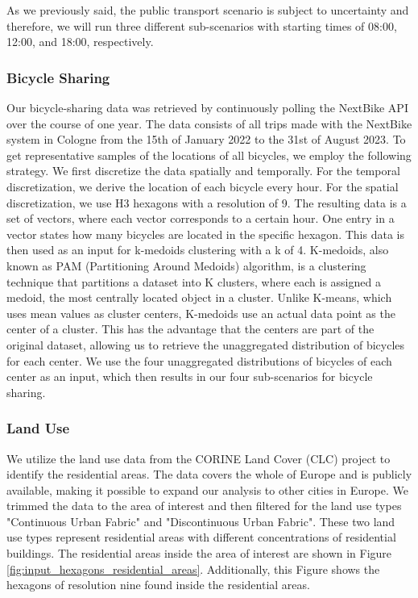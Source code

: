 As we previously said, the public transport scenario is subject to uncertainty and therefore, we will run three different sub-scenarios with starting times of 08:00, 12:00, and 18:00, respectively.


\subsubsection{Bicycle Sharing}
\label{subs:bicycle_sharing}

Our bicycle-sharing data was retrieved by continuously polling the NextBike API over the course of one year.
The data consists of all trips made with the NextBike system in Cologne from the 15th of January 2022 to the 31st of August 2023.
To get representative samples of the locations of all bicycles, we employ the following strategy.
We first discretize the data spatially and temporally.
For the temporal discretization, we derive the location of each bicycle every hour.
For the spatial discretization, we use H3 hexagons with a resolution of 9.
The resulting data is a set of vectors, where each vector corresponds to a certain hour.
One entry in a vector states how many bicycles are located in the specific hexagon.
This data is then used as an input for k-medoids clustering  with a k of 4.
K-medoids, also known as PAM (Partitioning Around Medoids) algorithm, is a clustering technique that partitions a dataset into K clusters, where each is assigned a medoid, the most centrally located object in a cluster. 
Unlike K-means, which uses mean values as cluster centers, K-medoids use an actual data point as the center of a cluster.
This has the advantage that the centers are part of the original dataset, allowing us to retrieve the unaggregated distribution of bicycles for each center.
We use the four unaggregated distributions of bicycles of each center as an input, which then results in our four sub-scenarios for bicycle sharing.


\subsubsection{Land Use}
\label{subs:land_use}

We utilize the land use data from the CORINE Land Cover (CLC) project  to identify the residential areas.
The data covers the whole of Europe and is publicly available, making it possible to expand our analysis to other cities in Europe.
We trimmed the data to the area of interest and then filtered for the land use types "Continuous Urban Fabric" and "Discontinuous Urban Fabric".
These two land use types represent residential areas with different concentrations of residential buildings.
The residential areas inside the area of interest are shown in Figure \ref{fig:input_hexagons_residential_areas}.
Additionally, this Figure shows the hexagons of resolution nine found inside the residential areas.

